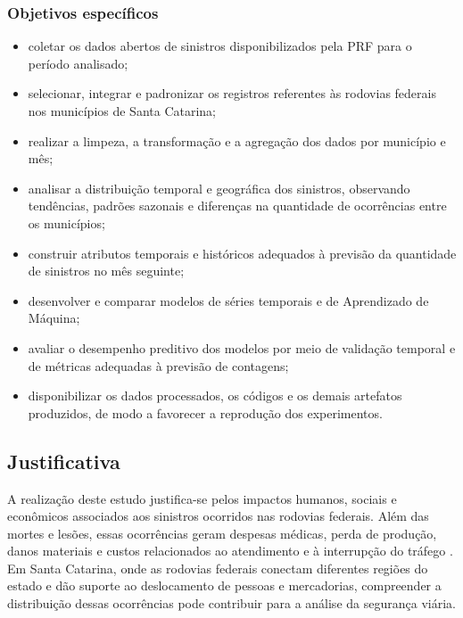\documentclass[12pt]{article}
\begin{document}
\subsubsection{Objetivos específicos}

\begin{itemize}
    \item coletar os dados abertos de sinistros disponibilizados pela PRF para o período analisado;

    \item selecionar, integrar e padronizar os registros referentes às rodovias federais nos municípios de Santa Catarina;

    \item realizar a limpeza, a transformação e a agregação dos dados por município e mês;

    \item analisar a distribuição temporal e geográfica dos sinistros, observando tendências, padrões sazonais e diferenças na quantidade de ocorrências entre os municípios;

    \item construir atributos temporais e históricos adequados à previsão da quantidade de sinistros no mês seguinte;

    \item desenvolver e comparar modelos de séries temporais e de Aprendizado de Máquina;

    \item avaliar o desempenho preditivo dos modelos por meio de validação temporal e de métricas adequadas à previsão de contagens;

    \item disponibilizar os dados processados, os códigos e os demais artefatos produzidos, de modo a favorecer a reprodução dos experimentos.
\end{itemize}

\subsection{Justificativa}

A realização deste estudo justifica-se pelos impactos humanos, sociais e econômicos associados aos sinistros ocorridos nas rodovias federais. Além das mortes e lesões, essas ocorrências geram despesas médicas, perda de produção, danos materiais e custos relacionados ao atendimento e à interrupção do tráfego \cite{ipea2015acidentes,cnt2023acidentes}. Em Santa Catarina, onde as rodovias federais conectam diferentes regiões do estado e dão suporte ao deslocamento de pessoas e mercadorias, compreender a distribuição dessas ocorrências pode contribuir para a análise da segurança viária.
\end{document}
